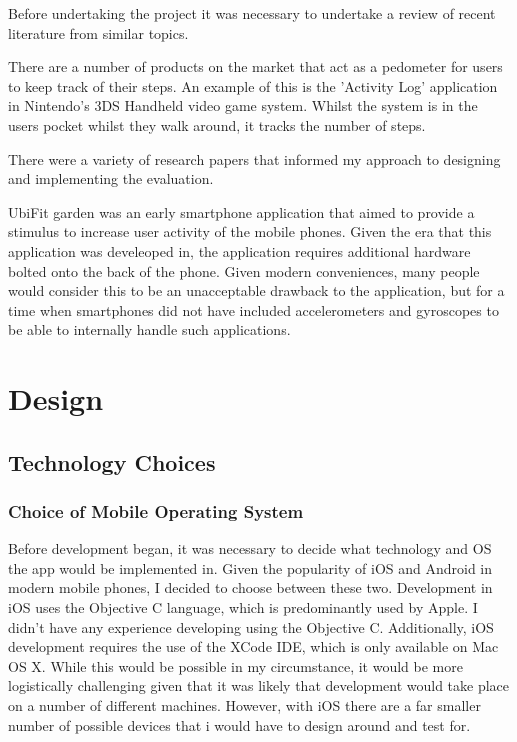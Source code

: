 \documentclass{l4proj}
\begin{document}
Before undertaking the project it was necessary to undertake a review of recent literature from similar topics.

There are a number of products on the market that act as a pedometer for users to keep track of their steps. An example of this is the 'Activity Log' application in Nintendo's 3DS Handheld video game system. Whilst the system is in the users pocket whilst they walk around, it tracks the number of steps.

There were a variety of research papers that informed my approach to designing and implementing the evaluation.

UbiFit garden was an early smartphone application that aimed to provide a stimulus to increase user activity of the mobile phones. Given the era that this application was develeoped in, the application requires additional hardware bolted onto the back of the phone. Given modern conveniences, many people would consider this to be an unacceptable drawback to the application, but for a time when smartphones did not have included accelerometers and gyroscopes to be able to internally handle such applications.


\chapter{Design}

\section{Technology Choices}

\subsection{Choice of Mobile Operating System}

Before development began, it was necessary to decide what technology and OS the app would be implemented in. Given the popularity of iOS and Android in modern mobile phones, I decided to choose between these two. Development in iOS uses the Objective C language, which is predominantly used by Apple. I didn’t have any experience developing using the Objective C. Additionally, iOS development requires the use of the XCode IDE, which is only available on Mac OS X.  While this would be possible in my circumstance, it would be more logistically challenging given that it was likely that development would take place on a number of different machines. However, with iOS there are a far smaller number of possible devices that i would have to design around and test for.
\end{document}
